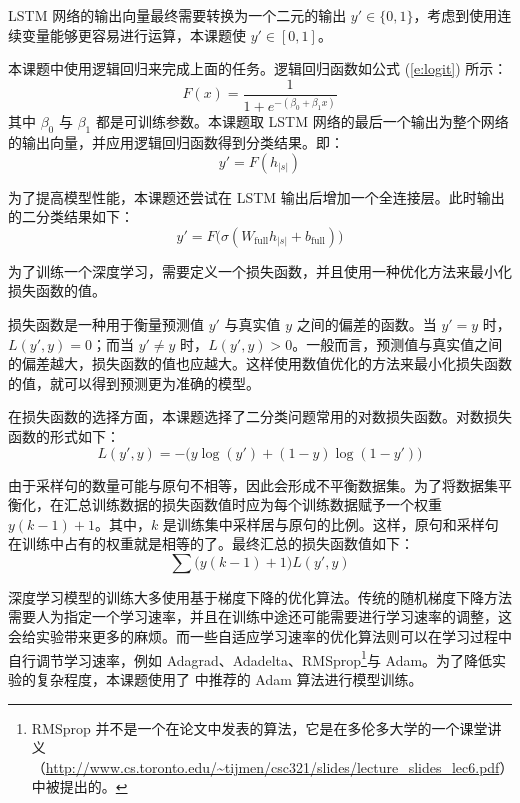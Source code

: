 LSTM 网络的输出向量最终需要转换为一个二元的输出 $y' \in \{0, 1\}$，考虑到使用连续变量能够更容易进行运算，本课题使 $y' \in [0, 1]$。

本课题中使用逻辑回归来完成上面的任务。逻辑回归函数如公式 (\ref{e:logit}) 所示：
\begin{equation}
F(x) = \frac{1}{1 + e^{-(\beta_0 + \beta_1 x)}}
\label{e:logit}
\end{equation}
其中 $\beta_0$ 与 $\beta_1$ 都是可训练参数。本课题取 LSTM 网络的最后一个输出为整个网络的输出向量，并应用逻辑回归函数得到分类结果。即：
\begin{equation}
y' = F(h_{|s|})
\end{equation}

为了提高模型性能，本课题还尝试在 LSTM 输出后增加一个全连接层。此时输出的二分类结果如下：
\begin{equation}
y' = F\bigl(\sigma(W_\text{full} h_{|s|} + b_\text{full})\bigr)
\end{equation}

\label{s:classifer p-training}
为了训练一个深度学习，需要定义一个损失函数，并且使用一种优化方法来最小化损失函数的值。

损失函数是一种用于衡量预测值 $y'$ 与真实值 $y$ 之间的偏差的函数。当 $y' = y$ 时，$L(y', y) = 0$；而当 $y' \neq y$ 时，$L(y', y) > 0$。一般而言，预测值与真实值之间的偏差越大，损失函数的值也应越大。这样使用数值优化的方法来最小化损失函数的值，就可以得到预测更为准确的模型。

在损失函数的选择方面，本课题选择了二分类问题常用的对数损失函数。对数损失函数的形式如下：
\begin{equation}
L(y', y) = -\bigl(y \log(y') + (1 - y) \log(1 - y')\bigr)
\end{equation}

由于采样句的数量可能与原句不相等，因此会形成不平衡数据集。为了将数据集平衡化，在汇总训练数据的损失函数值时应为每个训练数据赋予一个权重 $y(k - 1) + 1$。其中，$k$ 是训练集中采样居与原句的比例。这样，原句和采样句在训练中占有的权重就是相等的了。最终汇总的损失函数值如下：
\begin{equation}
\sum\bigl(y(k - 1) + 1\bigr) L(y', y)
\end{equation}

深度学习模型的训练大多使用基于梯度下降的优化算法。传统的随机梯度下降方法需要人为指定一个学习速率，并且在训练中途还可能需要进行学习速率的调整，这会给实验带来更多的麻烦。而一些自适应学习速率的优化算法则可以在学习过程中自行调节学习速率，例如 Adagrad、Adadelta、RMSprop\footnote{RMSprop 并不是一个在论文中发表的算法，它是在多伦多大学的一个课堂讲义（\url{http://www.cs.toronto.edu/~tijmen/csc321/slides/lecture_slides_lec6.pdf}）中被提出的。}与 Adam。为了降低实验的复杂程度，本课题使用了 \cite{Ruder2016} 中推荐的 Adam 算法进行模型训练。

